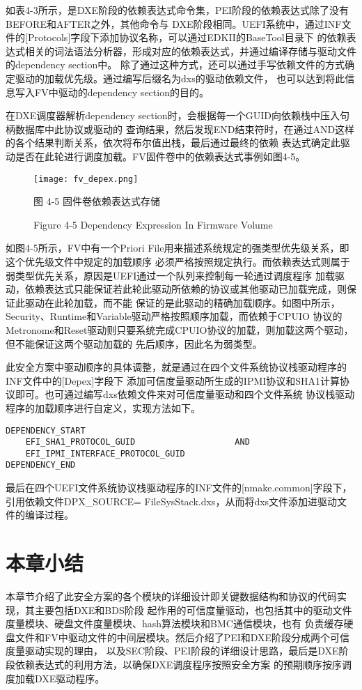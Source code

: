 如表4-3所示，是DXE阶段的依赖表达式命令集，PEI阶段的依赖表达式除了没有BEFORE和AFTER之外，其他命令与
DXE阶段相同。UEFI系统中，通过INF文件的[Protocols]字段下添加协议名称，可以通过EDKII的BaseTool目录下
的依赖表达式相关的词法语法分析器，形成对应的依赖表达式，并通过编译存储与驱动文件的dependency section中。
除了通过这种方式，还可以通过手写依赖文件的方式确定驱动的加载优先级。通过编写后缀名为dxs的驱动依赖文件，
也可以达到将此信息写入FV中驱动的dependency section的目的。
\par 在DXE调度器解析dependency section时，会根据每一个GUID向依赖栈中压入句柄数据库中此协议或驱动的
查询结果，然后发现END结束符时，在通过AND这样的各个结果判断关系，依次将布尔值出栈，最后通过最终的依赖
表达式确定此驱动是否在此轮进行调度加载。FV固件卷中的依赖表达式事例如图4-5。

\begin{figure}[htb]
    \label{ffs_format}
    \vspace{0cm}   
    \setlength{\abovecaptionskip}{0.3cm}
	\centering
    \texttt{[image: fv\_depex.png]}
    \caption*{图 4-5 固件卷依赖表达式存储}
    \setlength{\belowcaptionskip}{-0.7cm}
    \caption*{Figure 4-5 Dependency Expression In Firmware Volume}
\end{figure}

如图4-5所示，FV中有一个Priori File用来描述系统规定的强类型优先级关系，即这个优先级文件中规定的加载顺序
必须严格按照规定执行。而依赖表达式则属于弱类型优先关系，原因是UEFI通过一个队列来控制每一轮通过调度程序
加载驱动，依赖表达式只能保证若此轮此驱动所依赖的协议或其他驱动已加载完成，则保证此驱动在此轮加载，而不能
保证的是此驱动的精确加载顺序。如图中所示，Security、Runtime和Variable驱动严格按照顺序加载，而依赖于CPUIO
协议的Metronome和Reset驱动则只要系统完成CPUIO协议的加载，则加载这两个驱动，但不能保证这两个驱动加载的
先后顺序，因此名为弱类型。
\par 此安全方案中驱动顺序的具体调整，就是通过在四个文件系统协议栈驱动程序的INF文件中的[Depex]字段下
添加可信度量驱动所生成的IPMI协议和SHA1计算协议即可。也可通过编写dxs依赖文件来对可信度量驱动和四个文件系统
协议栈驱动程序的加载顺序进行自定义，实现方法如下。

\begin{lstlisting}
DEPENDENCY_START
    EFI_SHA1_PROTOCOL_GUID                    AND
    EFI_IPMI_INTERFACE_PROTOCOL_GUID
DEPENDENCY_END
\end{lstlisting}
\par 最后在四个UEFI文件系统协议栈驱动程序的INF文件的[nmake.common]字段下，引用依赖文件DPX\_SOURCE=
FileSysStack.dxs，从而将dxs文件添加进驱动文件的编译过程。

%
%
\section{本章小结}
本章节介绍了此安全方案的各个模块的详细设计即关键数据结构和协议的代码实现，其主要包括DXE和BDS阶段
起作用的可信度量驱动，也包括其中的驱动文件度量模块、硬盘文件度量模块、hash算法模块和BMC通信模块，也有
负责缓存硬盘文件和FV中驱动文件的中间层模块。然后介绍了PEI和DXE阶段分成两个可信度量驱动实现的理由，
以及SEC阶段、PEI阶段的详细设计思路，最后是DXE阶段依赖表达式的利用方法，以确保DXE调度程序按照安全方案
的预期顺序按序调度加载DXE驱动程序。

\bjutclearpage